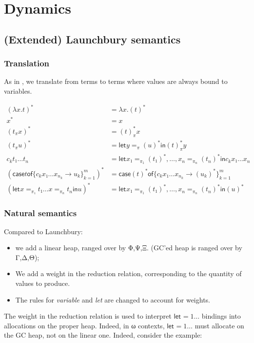 \documentclass[11pt]{article}
\newcommand{\case}[2]{\mathsf{case} #1 \mathsf{of} \{#2\}^m_{k=1}}
\newcommand{\flet}[1][]{\mathsf{let}_{#1} }
\newcommand{\fin}{ \mathsf{in} }
\begin{document}
\section{Dynamics}
\label{sec:orgheadline16}
\subsection{(Extended) Launchbury semantics}
\label{sec:orgheadline11}

\subsubsection{Translation}
\label{sec:orgheadline9}
As in \textcite{launchbury_natural_1993}, we translate from terms to
terms where values are always bound to variables. 


\begin{align*}
(λx. t)^* &= λx. (t)^* \\
x^*       &= x \\
  (t_π  x )^* &= (t)^*_π  x \\
  (t_π  u )^* &= \flet y =_{π} (u)^* \fin (t)^*_π  y \\
c_k  t₁ … t_n &= \flet x₁ =_{π_1} (t₁)^*,…, x_n =_{π_n} (t_n)^* \fin c_k x₁ … x_n \\
(\case t {c_k  x₁ … x_{n_k} → u_k})^* &= \case {(t)^*} {c_k  x₁ … x_{n_k} → (u_k)^*} \\
(\flet x =_{π₁} t₁  …  x =_{π_n} t_n \fin u)^* & = \flet x₁ =_{π_1} (t₁)^*,…, x_n =_{π_n} (t_n)^* \fin (u)^*
\end{align*}

\subsubsection{Natural semantics}
Compared to Launchbury:

\begin{itemize}
\item we add a linear heap, ranged over by Φ,Ψ,Ξ.
  (GC'ed heap is ranged over by Γ,Δ,Θ);
\item We add a weight in the reduction relation, corresponding to the
  quantity of values to produce.
\item The rules for \emph{variable} and \emph{let} are changed to
  account for weights.
\end{itemize}

The weight in the reduction relation is used to interpret $\flet =1 …$
bindings into allocations on the proper heap.  Indeed, in ω contexts,
$\flet =1 …$ must allocate on the GC heap, not on the linear
one. Indeed, consider the example:
\end{document}
